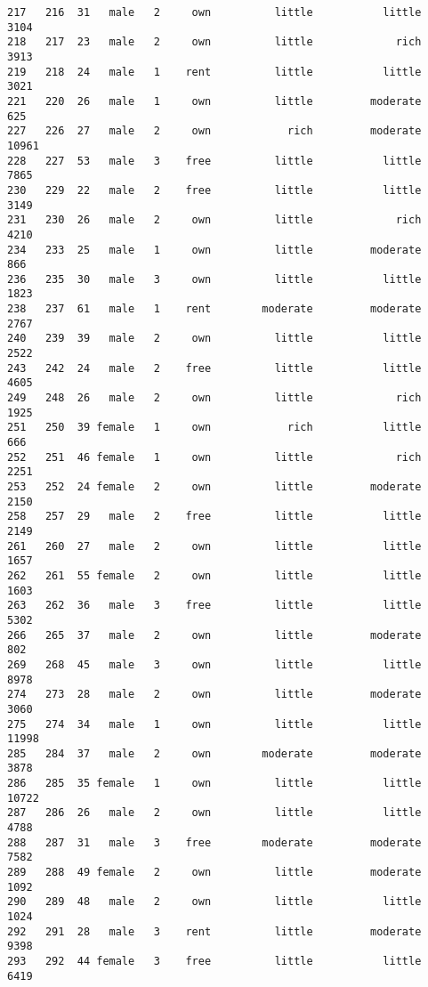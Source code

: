 \documentclass[
]{article}
\begin{document}
\begin{verbatim}
217   216  31   male   2     own          little           little          3104
218   217  23   male   2     own          little             rich          3913
219   218  24   male   1    rent          little           little          3021
221   220  26   male   1     own          little         moderate           625
227   226  27   male   2     own            rich         moderate         10961
228   227  53   male   3    free          little           little          7865
230   229  22   male   2    free          little           little          3149
231   230  26   male   2     own          little             rich          4210
234   233  25   male   1     own          little         moderate           866
236   235  30   male   3     own          little           little          1823
238   237  61   male   1    rent        moderate         moderate          2767
240   239  39   male   2     own          little           little          2522
243   242  24   male   2    free          little           little          4605
249   248  26   male   2     own          little             rich          1925
251   250  39 female   1     own            rich           little           666
252   251  46 female   1     own          little             rich          2251
253   252  24 female   2     own          little         moderate          2150
258   257  29   male   2    free          little           little          2149
261   260  27   male   2     own          little           little          1657
262   261  55 female   2     own          little           little          1603
263   262  36   male   3    free          little           little          5302
266   265  37   male   2     own          little         moderate           802
269   268  45   male   3     own          little           little          8978
274   273  28   male   2     own          little         moderate          3060
275   274  34   male   1     own          little           little         11998
285   284  37   male   2     own        moderate         moderate          3878
286   285  35 female   1     own          little           little         10722
287   286  26   male   2     own          little           little          4788
288   287  31   male   3    free        moderate         moderate          7582
289   288  49 female   2     own          little         moderate          1092
290   289  48   male   2     own          little           little          1024
292   291  28   male   3    rent          little         moderate          9398
293   292  44 female   3    free          little           little          6419

\end{verbatim}
\end{document}
